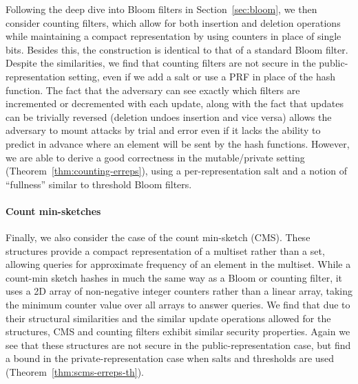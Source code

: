 Following the deep dive into Bloom filters in Section~\ref{sec:bloom}, we then
consider counting filters, which allow for both insertion and deletion operations
while maintaining a compact representation by using counters in place of single
bits. Besides this, the construction is identical to that of a standard Bloom filter.
Despite the similarities, we find that counting filters are not secure in the
public-representation setting, even if we add a salt or use a PRF in place of the
hash function. The fact that the adversary can see exactly which filters are
incremented or decremented with each update, along with the fact that updates can be
trivially reversed (deletion undoes insertion and vice versa) allows the
adversary to mount attacks by trial and error even if it lacks the ability to
predict in advance where an element will be sent by the hash functions.
However, we are able to derive a good correctness in the mutable/private setting
(Theorem~\ref{thm:counting-erreps}), using a per-representation salt and a
notion of ``fullness'' similar to threshold Bloom filters.

\paragraph{Count min-sketches}
Finally, we also consider the case of the count min-sketch (CMS). These structures
provide a compact representation of a
multiset rather than a set, allowing queries for
approximate frequency of an element in the multiset. While a count-min sketch
hashes in much the same way as a Bloom or counting filter, it uses a 2D array of non-negative
integer counters rather than a linear array, taking the minimum counter value
over all arrays to answer queries.
%
We find that due to their structural similarities and the similar update operations
allowed for the structures, CMS and counting filters exhibit similar security
properties. Again we see that these structures are not secure in the public-representation
case, but find a bound in the private-representation case when salts and thresholds
are used (Theorem~\ref{thm:scms-erreps-th}).
%


